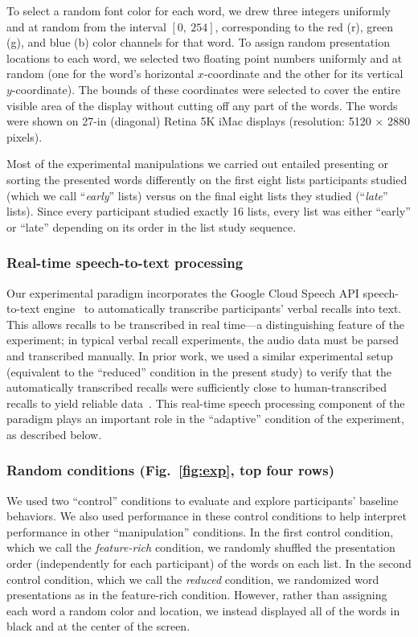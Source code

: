 \documentclass[11pt]{article}
\begin{document}
To select a random font color for each word, we drew three integers uniformly
and at random from the interval $\left[0,~254\right]$, corresponding to the red
(r), green (g), and blue (b) color channels for that word. To assign random
presentation locations to each word, we selected two floating point numbers
uniformly and at random (one for the word's horizontal $x$-coordinate and the
other for its vertical $y$-coordinate). The bounds of these coordinates were
selected to cover the entire visible area of the display without cutting off
any part of the words. The words were shown on 27-in (diagonal) Retina 5K iMac
displays (resolution: 5120 $\times$ 2880 pixels).

Most of the experimental manipulations we carried out entailed presenting or
sorting the presented words differently on the first eight lists participants
studied (which we call ``\textit{early}'' lists) versus on the final eight lists
they studied (``\textit{late}'' lists). Since every participant studied exactly 16
lists, every list was either ``early'' or ``late'' depending on its order in
the list study sequence.


\subsubsection*{Real-time speech-to-text processing}

Our experimental paradigm incorporates the Google Cloud Speech API
speech-to-text engine~\citep{HalpEtal16} to automatically transcribe
participants' verbal recalls into text. This allows recalls to be transcribed
in real time---a distinguishing feature of the experiment; in typical verbal
recall experiments, the audio data must be parsed and transcribed manually. In
prior work, we used a similar experimental setup (equivalent to the ``reduced''
condition in the present study) to verify that the automatically transcribed
recalls were sufficiently close to human-transcribed recalls to yield reliable
data~\citep{ZimaEtal18}. This real-time speech processing component of the
paradigm plays an important role in the ``adaptive'' condition of the
experiment, as described below.

\subsubsection*{Random conditions (Fig.~\ref{fig:exp}, top four rows)}

We used two ``control'' conditions to evaluate and explore participants'
baseline behaviors. We also used performance in these control conditions to
help interpret performance in other ``manipulation'' conditions. In the first
control condition, which we call the \textit{feature-rich} condition, we
randomly shuffled the presentation order (independently for each participant)
of the words on each list. In the second control condition, which we call the
\textit{reduced} condition, we randomized word presentations as in the feature-rich
condition. However, rather than assigning each word a random color and
location, we instead displayed all of the words in black and at the center of
the screen.
\end{document}
